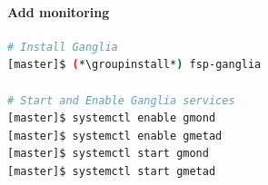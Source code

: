 \documentclass[letterpaper]{article}
\newcommand{\groupinstall}{yum -y groupinstall}
\begin{document}
\paragraph{Add \Ganglia{} monitoring}



\begin{lstlisting}[language=bash,keywords={},upquote=true]
# Install Ganglia
[master]$ (*\groupinstall*) fsp-ganglia

# Start and Enable Ganglia services
[master]$ systemctl enable gmond
[master]$ systemctl enable gmetad
[master]$ systemctl start gmond
[master]$ systemctl start gmetad
\end{lstlisting}


\end{document}
